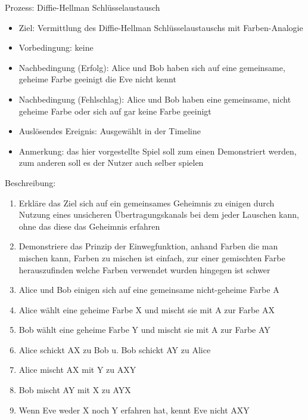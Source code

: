 \documentclass{article}
\begin{document}

\begin{FA}[start=100]
\item Prozess: Diffie-Hellman Schlüsselaustausch
\end{FA}
\begin{itemize}[label={}]
    \item Ziel: Vermittlung des Diffie-Hellman Schlüsselaustauschs mit Farben-Analogie
    \item Vorbedingung: keine
    \item Nachbedingung (Erfolg): Alice und Bob haben sich auf eine 
        gemeinsame, geheime Farbe geeinigt die Eve nicht kennt
    \item Nachbedingung (Fehlschlag): Alice und Bob haben eine gemeinsame, 
        nicht geheime Farbe oder sich auf gar keine Farbe geeinigt
    \item Auslösendes Ereignis: Ausgewählt in der Timeline
    \item Anmerkung: das hier vorgestellte Spiel 
        soll zum einen Demonstriert werden,
        zum anderen soll es der Nutzer auch selber spielen
\end{itemize}

Beschreibung:
\begin{enumerate}
    \item Erkläre das Ziel sich auf ein gemeinsames Geheimnis zu einigen
        durch Nutzung eines unsicheren Übertragungskanals
        bei dem jeder Lauschen kann, ohne das diese das Geheimnis erfahren
    \item Demonstriere das Prinzip der Einwegfunktion, anhand Farben die man mischen
        kann, Farben zu mischen ist einfach, zur einer gemischten Farbe
        herauszufinden welche Farben verwendet wurden hingegen ist schwer
    \item Alice und Bob einigen sich auf eine gemeinsame nicht-geheime Farbe A
    \item Alice wählt eine geheime Farbe X und mischt sie mit A zur Farbe AX
    \item Bob wählt eine geheime Farbe Y und mischt sie mit A zur Farbe AY
    \item Alice schickt AX zu Bob u. Bob schickt AY zu Alice
    \item Alice mischt AX mit Y zu AXY
    \item Bob mischt AY mit X zu AYX
    \item Wenn Eve weder X noch Y erfahren hat, kennt Eve nicht AXY
\end{enumerate}
\end{document}
